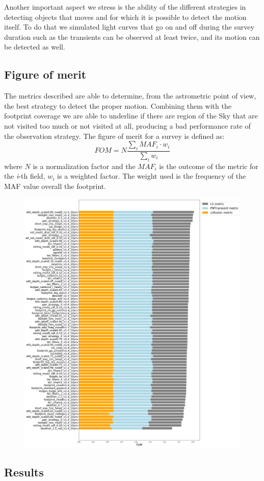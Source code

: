 Another important aspect we stress is the ability of the different strategies in detecting objects that moves and for which it is possible to detect the motion itself. To do that we simulated light curves that go on and off during the survey duration such as the transients can be observed at least twice, and its motion can be detected as well. 


\subsection{Figure of merit}
The metrics described are able to determine, from the astrometric point of view, the best strategy to detect the proper motion. Combining them with the footprint coverage we are able to underline if there are region of the Sky that are not visited too much or not visited at all, producing a bad performance rate of the observation strategy. 
The figure of merit for a survey is defined as:
\begin{equation}
    FOM = N\frac{\sum_i MAF_i\cdot w_i}{\sum_i w_i}
\end{equation}
where $N$ is a normalization factor and the $MAF_i$ is the outcome of the metric for the \emph{i}-th field, $w_i$ is a weighted factor. The weight used is the frequency of the MAF value overall the footprint.   


\begin{figure}
    \centering
    \includegraphics[scale=0.28]{figures/FOM_astrometry.png}
    \caption{}
    \label{fig:FOM_astrometry}
\end{figure}

\subsection{Results}

% 